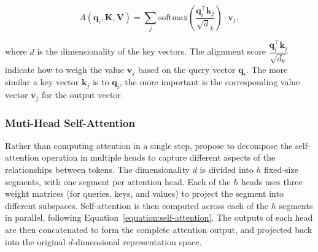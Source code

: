 \begin{equation}
    A(\bm{q}_i, \bm{K}, \bm{V}) = \sum_j \textrm{softmax}\left(\frac{\bm{q}_i^{\top} \bm{k}_j}{\sqrt{d}_k}\right) \cdot \bm{v}_j,
\label{equation:self-attention}
\end{equation}


\noindent where $d$ is the dimensionality of the key vectors. The alignment score $\dfrac{\bm{q}_i^{\top} \bm{k}_j}{\sqrt{d_k}}$ indicate how to weigh the value $\bm{v}_j$ based on the query vector $\bm{q}_i$. The more similar a key vector $\bm{k}_j$ is to $\bm{q}_i$, the more important is the corresponding value vector $\bm{v}_j$ for the output vector. 


\subsubsection{Muti-Head Self-Attention} 

Rather than computing attention in a single step, \citet{vaswani2017attention} propose to decompose the self-attention operation in multiple heads to capture different aspects of the relationships between tokens. The dimensionality $d$ is divided into $h$ fixed-size segments, with one segment per attention head. Each of the $h$ heads uses three weight matrices (for queries, keys, and values) to project the segment into different subspaces. Self-attention is then computed across each of the $h$ segments in parallel, following Equation~\ref{equation:self-attention}. The outputs of each head are then concatenated to form the complete attention output, and projected back into the original $d$-dimensional representation space.



